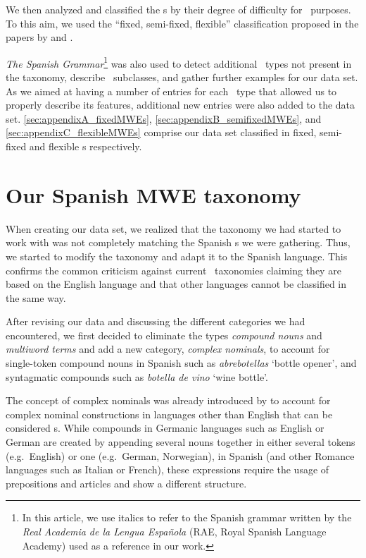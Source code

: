 \documentclass[output=paper]{langsci/langscibook}
\begin{document}
   

 
We then analyzed and classified the \mwe s by their degree of difficulty for \nlp\ purposes.
To this aim, we used the ``fixed, semi-fixed, flexible'' classification proposed in the papers by \citet{Sag:2002} and \citet{Baldwin2010}.

  
\textit{The Spanish Grammar}\footnote{In this article, we use italics to refer to the Spanish grammar written by the \textit{Real Academia de la Lengua Española} (RAE, Royal Spanish Language Academy) used as a reference in our work.} \citep{RAE:2010} was also used to detect additional \mwe\ types not present in the taxonomy, describe \mwe\ subclasses, and gather further examples for our data set.
As we aimed at having a number of entries for each \mwe\ type that allowed us to properly describe its features, additional new entries were also added to the data set.
\ref{sec:appendixA_fixedMWEs}, \ref{sec:appendixB_semifixedMWEs}, and \ref{sec:appendixC_flexibleMWEs} 
comprise our data set classified in fixed, semi-fixed and flexible \mwe s respectively.

\largerpage
\section{Our Spanish MWE taxonomy}
\label{sec:ourTaxonomy}

When creating our data set, we realized that the taxonomy we had started to work with was not completely matching the Spanish \mwe s we were gathering. 
Thus, we started to modify the taxonomy and adapt it to the Spanish language. 
This confirms the common criticism against current \mwe\ taxonomies claiming they are based on the English language and that other languages cannot be classified in the same way. 

After revising our data and discussing the different categories we had encountered, we first decided to eliminate the types \textit{compound nouns} and \textit{multiword terms} 
and add a new category, \textit{complex nominals}, to account for single-token compound nouns in Spanish such as \textit{abrebotellas} `bottle opener', and syntagmatic compounds such as \textit{botella de vino} `wine bottle'.

The concept of complex nominals was already introduced by \citet{Atkins:2001} to account for complex nominal constructions in languages other than English that can be considered \mwe s.
While compounds in Germanic languages such as  English or  German are created by appending several nouns together in either several tokens (e.g.\ English) or one (e.g.\ German, Norwegian), in Spanish (and other Romance languages such as Italian or French), these expressions require the usage of prepositions and articles and show a different structure. 
\end{document}
